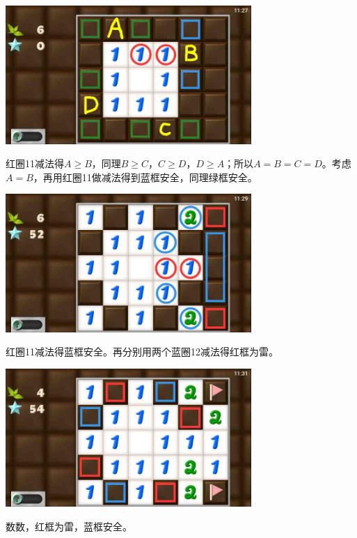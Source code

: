 \subsection{} %
\begin{center}
    \includegraphics[width=0.7\textwidth]{puzzlelow/15-1.jpg}
\end{center}
红圈11减法得$A\ge B$，同理$B\ge C$，$C\ge D$，$D\ge A$；所以$A=B=C=D$。考虑$A=B$，再用红圈11做减法得到蓝框安全，同理绿框安全。
\begin{center}
    \includegraphics[width=0.7\textwidth]{puzzlelow/15-2.jpg}
\end{center}
红圈11减法得蓝框安全。再分别用两个蓝圈12减法得红框为雷。
\begin{center}
    \includegraphics[width=0.7\textwidth]{puzzlelow/15-3.jpg}
\end{center}
数数，红框为雷，蓝框安全。

